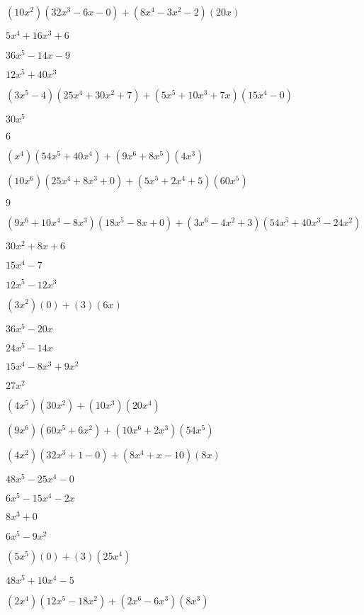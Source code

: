 \documentclass{article}
\begin{document}
\begin{multicols}{2}
$(10x^2)(32x^{3}-6x-0)+(8x^{4}-3x^2-2)(20x)$\item $5x^{4}+16x^{3}+6$\item $36x^{5}-14x-9$\item $12x^{5}+40x^{3}$\item $(3x^{5}-4)(25x^{4}+30x^{2}+7)+(5x^{5}+10x^{3}+7x)(15x^{4}-0)$\item $30x^{5}$\item $6$\item $(x^{4})(54x^{5}+40x^{4})+(9x^{6}+8x^{5})(4x^{3})$\item $(10x^{6})(25x^{4}+8x^{3}+0)+(5x^{5}+2x^{4}+5)(60x^{5})$\item $9$\item $(9x^{6}+10x^{4}-8x^{3})(18x^{5}-8x+0)+(3x^{6}-4x^2+3)(54x^{5}+40x^{3}-24x^{2})$\item $30x^{2}+8x+6$\item $15x^{4}-7$\item $12x^{5}-12x^{3}$\item $(3x^2)(0)+(3)(6x)$\item $36x^{5}-20x$\item $24x^{5}-14x$\item $15x^{4}-8x^{3}+9x^{2}$\item $27x^{2}$\item $(4x^{5})(30x^{2})+(10x^{3})(20x^{4})$\item $(9x^{6})(60x^{5}+6x^{2})+(10x^{6}+2x^{3})(54x^{5})$\item $(4x^2)(32x^{3}+1-0)+(8x^{4}+x-10)(8x)$\item $48x^{5}-25x^{4}-0$\item $6x^{5}-15x^{4}-2x$\item $8x^{3}+0$\item $6x^{5}-9x^{2}$\item $(5x^{5})(0)+(3)(25x^{4})$\item $48x^{5}+10x^{4}-5$\item $(2x^{4})(12x^{5}-18x^{2})+(2x^{6}-6x^{3})(8x^{3})$\item 
\end{multicols}
\end{document}
